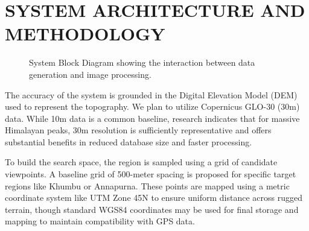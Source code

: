 \chapter{SYSTEM ARCHITECTURE AND METHODOLOGY}

\begin{figure}[h]
    \centering
    \caption{System Block Diagram showing the interaction between data generation and image processing.}
    \label{fig:block_diagram}
\end{figure}

The accuracy of the system is grounded in the Digital Elevation Model (DEM) used to represent the topography. We plan to utilize Copernicus GLO-30 (30m) data. While 10m data is a common baseline, research indicates that for massive Himalayan peaks, 30m resolution is sufficiently representative and offers substantial benefits in reduced database size and faster processing.

To build the search space, the region is sampled using a grid of candidate viewpoints. A baseline grid of 500-meter spacing is proposed for specific target regions like Khumbu or Annapurna. These points are mapped using a metric coordinate system like UTM Zone 45N to ensure uniform distance across rugged terrain, though standard WGS84 coordinates may be used for final storage and mapping to maintain compatibility with GPS data.

